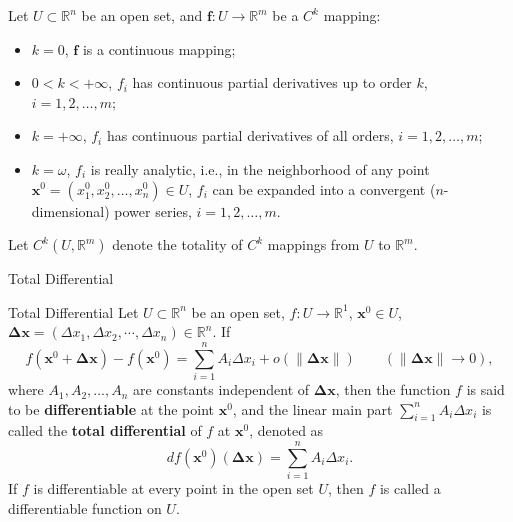 \documentclass[11pt]{../../TexTemplate/elegantbook}
\begin{document}
\begin{note}
    Let \(U \subset \mathbb{R}^n\) be an open set, and \(\mathbf{f}: U \to \mathbb{R}^m\) be a \(C^k\) mapping:  
    \begin{itemize}
        \item \(k = 0\), \(\mathbf{f}\) is a continuous mapping;
        \item \(0 < k < +\infty\), \(f_i\) has continuous partial derivatives up to order \(k\), \(i = 1, 2, \dots, m\);
        \item \(k = +\infty\), \(f_i\) has continuous partial derivatives of all orders, \(i = 1, 2, \dots, m\);
        \item \(k = \omega\), \(f_i\) is really analytic, i.e., 
            in the neighborhood of any point \(\mathbf{x}^0 = (x_1^0, x_2^0, \dots, x_n^0) \in U\), 
            \(f_i\) can be expanded into a convergent (\(n\)-dimensional) power series, \(i = 1, 2, \dots, m\).
    \end{itemize}
    Let \(C^k(U, \mathbb{R}^m)\) denote the totality of \(C^k\) mappings from \(U\) to \(\mathbb{R}^m\).
\end{note}


\begin{leftbarTitle}{Total Differential}\end{leftbarTitle}
\begin{definition}{Total Differential}
    Let \(U\subset \mathbb{R}^n\) be an open set, \(f: U\to \mathbb{R}^{1}\), \(\mathbf{x}^{0}\in U\),
    \(\mathbf{\Delta x}=\left( \Delta x_{1},\Delta x_{2},\cdots,\Delta x_{n} \right) \in \mathbb{R}^{n}\). If
    \[
    f(\mathbf{x}^{0} + \mathbf{\Delta x}) - f(\mathbf{x}^{0}) = 
    \sum_{i=1}^n A_{i} \Delta x_{i} + o(\|\mathbf{\Delta x}\|) \qquad (\|\mathbf{\Delta x}\| \to 0),
    \]
    where \(A_{1}, A_{2}, \dots, A_{n}\) are constants independent of \(\mathbf{\Delta x}\), 
    then the function \(f\) is said to be \textbf{differentiable} at the point \(\mathbf{x}^{0}\), 
    and the linear main part \(\sum_{i=1}^n A_{i} \Delta x_{i}\) is called the \textbf{total differential} 
    of \(f\) at \(\mathbf{x}^{0}\), 
    denoted as
    \[
    df(\mathbf{x}^{0})(\mathbf{\Delta x}) = \sum_{i=1}^n A_{i} \Delta x_{i}.
    \]
    If \(f\) is differentiable at every point in the open set \(U\), 
    then \(f\) is called a differentiable function on \(U\).    
\end{definition}
\end{document}
